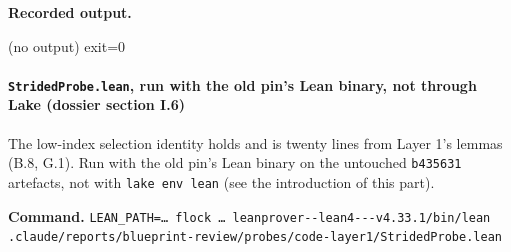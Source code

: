 \textbf{Recorded output.}

\begin{srccode}
(no output)
exit=0
\end{srccode}

\paragraph{\texttt{StridedProbe.\allowbreak{}lean}, run with the old pin's Lean binary, not through Lake (dossier section I.6)}\label{sec:gen-layer1-I6}

The low-index selection identity holds and is twenty lines from Layer 1's lemmas (B.8, G.1). Run with the old pin's Lean binary on the untouched \texttt{b435631} artefacts, not with \texttt{lake env lean} (see the introduction of this part).

\textbf{Command.} \texttt{L\allowbreak{}E\allowbreak{}A\allowbreak{}N\allowbreak{}\_\allowbreak{}P\allowbreak{}A\allowbreak{}T\allowbreak{}H\allowbreak{}=\allowbreak{}…\allowbreak{} f\allowbreak{}l\allowbreak{}o\allowbreak{}c\allowbreak{}k\allowbreak{} …\allowbreak{} l\allowbreak{}e\allowbreak{}a\allowbreak{}n\allowbreak{}p\allowbreak{}r\allowbreak{}o\allowbreak{}v\allowbreak{}e\allowbreak{}r\allowbreak{}-{}\allowbreak{}-{}\allowbreak{}l\allowbreak{}e\allowbreak{}a\allowbreak{}n\allowbreak{}4\allowbreak{}-{}\allowbreak{}-{}\allowbreak{}-{}\allowbreak{}v\allowbreak{}4\allowbreak{}.\allowbreak{}3\allowbreak{}3\allowbreak{}.\allowbreak{}1\allowbreak{}/\allowbreak{}b\allowbreak{}i\allowbreak{}n\allowbreak{}/\allowbreak{}l\allowbreak{}e\allowbreak{}a\allowbreak{}n\allowbreak{} .\allowbreak{}c\allowbreak{}l\allowbreak{}a\allowbreak{}u\allowbreak{}d\allowbreak{}e\allowbreak{}/\allowbreak{}r\allowbreak{}e\allowbreak{}p\allowbreak{}o\allowbreak{}r\allowbreak{}t\allowbreak{}s\allowbreak{}/\allowbreak{}b\allowbreak{}l\allowbreak{}u\allowbreak{}e\allowbreak{}p\allowbreak{}r\allowbreak{}i\allowbreak{}n\allowbreak{}t\allowbreak{}-{}\allowbreak{}r\allowbreak{}e\allowbreak{}v\allowbreak{}i\allowbreak{}e\allowbreak{}w\allowbreak{}/\allowbreak{}p\allowbreak{}r\allowbreak{}o\allowbreak{}b\allowbreak{}e\allowbreak{}s\allowbreak{}/\allowbreak{}c\allowbreak{}o\allowbreak{}d\allowbreak{}e\allowbreak{}-{}\allowbreak{}l\allowbreak{}a\allowbreak{}y\allowbreak{}e\allowbreak{}r\allowbreak{}1\allowbreak{}/\allowbreak{}S\allowbreak{}t\allowbreak{}r\allowbreak{}i\allowbreak{}d\allowbreak{}e\allowbreak{}d\allowbreak{}P\allowbreak{}r\allowbreak{}o\allowbreak{}b\allowbreak{}e\allowbreak{}.\allowbreak{}l\allowbreak{}e\allowbreak{}a\allowbreak{}n}

